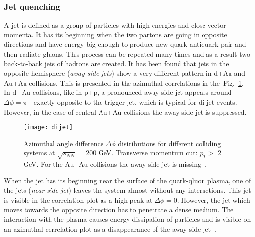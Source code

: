       \subsubsection{Jet quenching}
        A jet is defined as a group of particles with high energies and close vector momenta.
        It has its beginning when the two partons are going in opposite directions and have energy big enough to produce new quark-antiquark pair and then radiate gluons.
        This process can be repeated many times and as a result two back-to-back jets of hadrons are created.
        It has been found that jets in the opposite hemisphere (\textit{away-side jets}) show a very different pattern in d+Au and Au+Au collisions.
        This is presented in the azimuthal correlations in the~Fig.~\ref{fig:di-jet}.
        In d+Au collisions, like in p+p, a pronounced away-side jet appears around $\Delta \phi = \pi$ - exactly opposite to the trigger jet, which is typical for di-jet events.
        However, in the case of central Au+Au collisions the away-side jet is suppressed. 
        \begin{figure}[b]
          \centering
          \texttt{[image: dijet]}
          \caption{Azimuthal angle difference $\Delta \phi$ distributions for different colliding systems at $\sqrt{s_{NN}}$ = 200 GeV. Transverse momentum cut: $p_T >$ 2 GeV. For the Au+Au collisions the away-side jet is missing~\cite{rhic_jets}.}
          \label{fig:di-jet}
        \end{figure}
        When the jet has its beginning near the surface of the quark-qluon plasma, one of the jets (\textit{near-side jet}) leaves the system almost without any interactions.
        This jet is visible in the correlation plot as a high peak at $\Delta \phi = 0$.
        However, the jet which moves towards the opposite direction has to penetrate a dense medium.
        The interaction with the plasma causes energy dissipation of particles and is visible on an azimuthal correlation plot as a disappearance of the away-side jet~\cite{bartke}.

